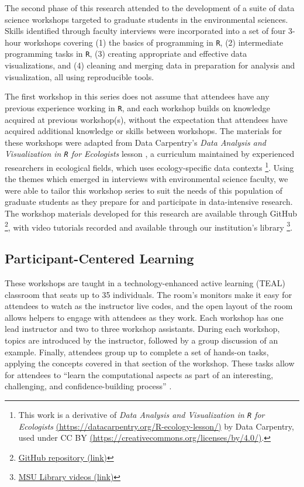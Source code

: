 \documentclass[12pt]{article}
\begin{document}
\quad The second phase of this research attended to the  development of a suite
of data science workshops targeted to graduate students in the environmental
sciences. Skills identified through faculty interviews were incorporated into a
set of four 3-hour workshops covering (1) the basics of programming in 
\texttt{R}, (2) intermediate programming tasks in \texttt{R}, (3) creating
appropriate and effective data visualizations, and (4) cleaning and merging data
in preparation for analysis and visualization, all using reproducible tools. 

\quad The first workshop in this series does not assume that attendees have any
previous experience working in \texttt{R}, and each workshop builds on knowledge
acquired at previous workshop(s), without the expectation that attendees have
acquired additional knowledge or skills between workshops. The materials for 
these workshops were adapted from Data Carpentry's \emph{Data Analysis and
Visualization in \texttt{R} for Ecologists} lesson \citep{ecology_curriculum}, a
curriculum maintained by experienced researchers in ecological fields, which 
uses ecology-specific data contexts \footnote{This work is a derivative of 
\emph{Data Analysis and Visualization in \texttt{R} for Ecologists} 
\href{https://datacarpentry.org/R-ecology-lesson/}{(https://datacarpentry.org/R-ecology-lesson/)}
by Data Carpentry, used under CC BY 
\href{https://creativecommons.org/licenses/by/4.0/}{(https://creativecommons.org/licenses/by/4.0/)}.}. 
Using the themes which emerged in interviews with environmental science faculty,
we were able to tailor this workshop series to suit the needs of this population
of graduate students as they prepare for and participate in data-intensive
research. The workshop materials developed for this research are available
through GitHub
\footnote{\href{https://github.com/atheobold/data-science-workshops-jse}{GitHub repository (link)}}, with video tutorials recorded and available through our institution's library 
\footnote{\href{http://bit.ly/ws_recordings}{MSU Library videos (link)}}.  

\subsection{Participant-Centered Learning}  

\quad These workshops are taught in a technology-enhanced active learning (TEAL)
classroom that seats up to 35 individuals. The room's monitors make it easy for 
attendees to watch as the instructor live codes, and the open layout of the room
allows helpers to engage with attendees as they work. Each workshop has one lead
instructor and two to three workshop assistants. During each workshop, topics
are introduced by the instructor, followed by a group discussion of an example. 
Finally, attendees group up to complete a set of hands-on tasks, applying the
concepts covered in that section of the workshop. These tasks allow for
attendees to ``learn the computational aspects as part of an interesting, 
challenging, and confidence-building process'' \citep[p. 101]{nolan}.
\end{document}
